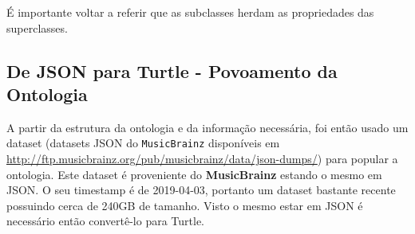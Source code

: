 \documentclass{article}
\begin{document}
É importante voltar a referir que as subclasses herdam as propriedades das superclasses.

\subsection{De JSON para Turtle - Povoamento da Ontologia}

A partir da estrutura da ontologia e da informação necessária, foi então usado um dataset (datasets JSON do \texttt{MusicBrainz} disponíveis em \url{http://ftp.musicbrainz.org/pub/musicbrainz/data/json-dumps/}) para popular a ontologia. Este dataset é proveniente do \textbf{MusicBrainz} estando o mesmo em JSON. O seu timestamp é de 2019-04-03, portanto um dataset bastante recente possuindo cerca de 240GB de tamanho. Visto o mesmo estar em JSON é necessário então convertê-lo para Turtle.
\end{document}
